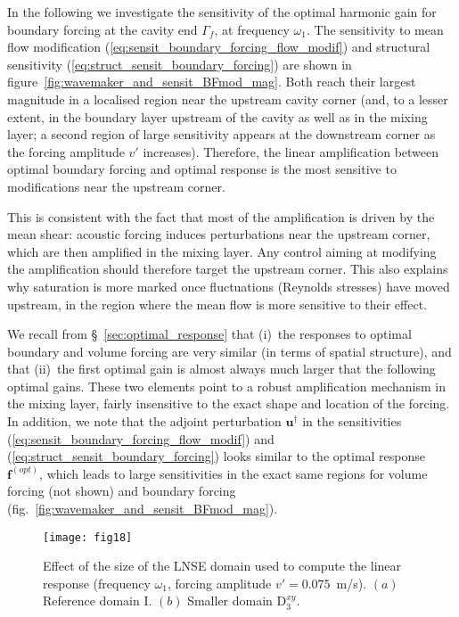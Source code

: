\documentclass[11pt,onecolumn]{article}
\def\ff {\mathbf{f}}
\def\uu {\mathbf{u}}
\def\dom    {{\mbox{I}}}
\begin{document}
In the following we investigate the sensitivity of the optimal harmonic gain for boundary forcing at the cavity end $\Gamma_f$, at frequency $\omega_1$. 
The sensitivity to mean flow modification (\ref{eq:sensit_boundary_forcing_flow_modif})
and structural sensitivity (\ref{eq:struct_sensit_boundary_forcing}) are shown in figure~\ref{fig:wavemaker_and_sensit_BFmod_mag}.
Both reach their largest magnitude in a localised region near the upstream cavity corner (and, to a lesser extent, in the boundary layer upstream of the cavity as well as in the mixing layer;
a second region of large sensitivity appears at  the downstream corner as the forcing amplitude $v'$ increases).
Therefore, the linear amplification between optimal boundary forcing  and optimal response is the most sensitive to modifications near the upstream corner.

This is consistent with the fact that most of the amplification is driven by the mean shear:
acoustic forcing induces perturbations near the upstream corner, which are then amplified in the  mixing layer.
Any control aiming at modifying the amplification should therefore target the upstream corner.
This also explains why saturation is more marked once fluctuations (Reynolds stresses) have moved upstream, in the region where the mean flow is more sensitive to their effect.

We recall from \S~\ref{sec:optimal_response} that 
(i)~the responses to optimal boundary and volume forcing are very similar (in terms of spatial structure), and that 
(ii)~the first optimal gain is almost always much larger that the following optimal gains.
These two elements point to a robust amplification mechanism in the mixing layer, fairly insensitive to the exact shape and location of the forcing.
In addition, we note that the adjoint perturbation $\uu^\dag$ in the sensitivities (\ref{eq:sensit_boundary_forcing_flow_modif}) and  (\ref{eq:struct_sensit_boundary_forcing}) looks similar to the optimal response $\ff^{(opt)}$, which leads to large sensitivities in the exact same regions for volume forcing (not shown) and boundary forcing (fig.~\ref{fig:wavemaker_and_sensit_BFmod_mag}).


\begin{figure}[] %
\centerline{   
\texttt{[image: fig18]}
}   
\vspace{-0.2cm}
\caption{
Effect of the size of the LNSE domain used to compute the linear response (frequency $\omega_1$, 
forcing amplitude $v'=0.075$~m/s).
$(a)$ Reference domain \dom.
$(b)$ Smaller domain D$^{xy}_3$.
} 
\label{fig:comp_resp_smaller_dom}
\end{figure}
\end{document}
